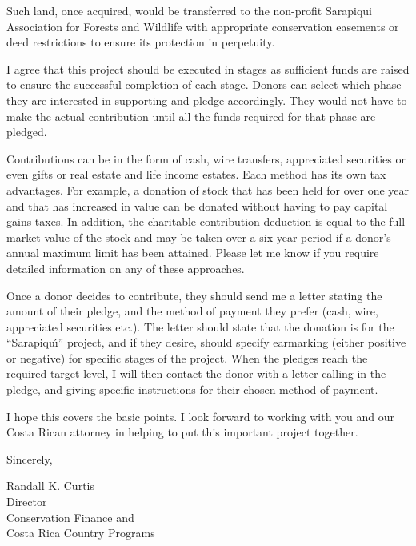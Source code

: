 Such land, once acquired, would be transferred to the non-profit
Sarapiqui Association for Forests and Wildlife with appropriate
conservation easements or deed restrictions to ensure its protection
in perpetuity.

I agree that this project should be executed in stages as sufficient
funds are raised to ensure the successful completion of each stage.
Donors can select which phase they are interested in supporting and
pledge accordingly.  They would not have to make the actual contribution
until all the funds required for that phase are pledged.

Contributions can be in the form of cash, wire transfers, appreciated
securities or even gifts or real estate and life income estates.  Each
method has its own tax advantages.  For example, a donation of stock
that has been held for over one year and that has increased in value
can be donated without having to pay capital gains taxes.  In addition,
the charitable contribution deduction is equal to the full market value
of the stock and may be taken over a six year period if a donor's
annual maximum limit has been attained.  Please let me know if you
require detailed information on any of these approaches.

Once a donor decides to contribute, they should send me a letter stating
the amount of their pledge, and the method of payment they prefer (cash,
wire, appreciated securities etc.).  The letter should state that the
donation is for the ``Sarapiqu\'{\i}'' project, and if they desire, should
specify earmarking (either positive or negative) for specific stages
of the project.  When the pledges reach the required target level, I will
then contact the donor with a letter calling in the pledge, and giving
specific instructions for their chosen method of payment.

I hope this covers the basic points.  I look forward to working with you
and our Costa Rican attorney in helping to put this important project
together.

Sincerely,

Randall K. Curtis\\
Director\\
Conservation Finance and\\
Costa Rica Country Programs
\eLP


